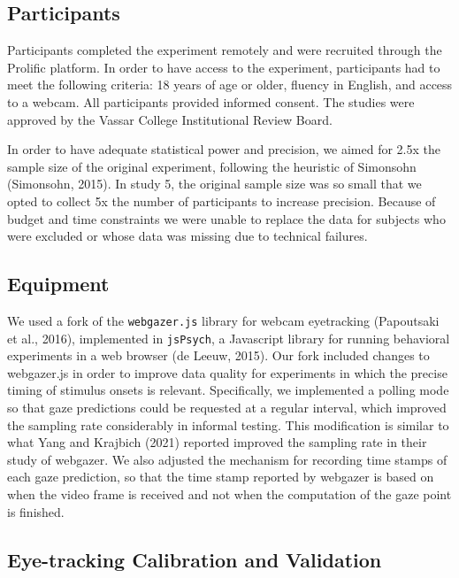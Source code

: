 \documentclass[
  man,floatsintext]{apa6}
\begin{document}
\hypertarget{participants}{%
\subsection{Participants}\label{participants}}

Participants completed the experiment remotely and were recruited
through the Prolific platform. In order to have access to the
experiment, participants had to meet the following criteria: 18 years of
age or older, fluency in English, and access to a webcam. All
participants provided informed consent. The studies were approved by the
Vassar College Institutional Review Board.

In order to have adequate statistical power and precision, we aimed for
2.5x the sample size of the original experiment, following the heuristic
of Simonsohn (Simonsohn, 2015). In study 5, the original sample size was so
small that we opted to collect 5x the number of participants to increase
precision. Because of budget and time constraints we were unable to
replace the data for subjects who were excluded or whose data was
missing due to technical failures.

\hypertarget{equipment}{%
\subsection{Equipment}\label{equipment}}

We used a fork of the \texttt{webgazer.js} library for webcam eyetracking
(Papoutsaki et al., 2016), implemented in \texttt{jsPsych}, a Javascript
library for running behavioral experiments in a web browser
(de Leeuw, 2015). Our fork included changes to
webgazer.js in order to improve data quality for experiments in which
the precise timing of stimulus onsets is relevant. Specifically, we
implemented a polling mode so that gaze predictions could be requested
at a regular interval, which improved the sampling rate considerably in
informal testing. This modification is similar to what Yang and Krajbich
(2021) reported improved the sampling rate in their study of
webgazer. We also adjusted the mechanism for recording time stamps of
each gaze prediction, so that the time stamp reported by webgazer is
based on when the video frame is received and not when the computation
of the gaze point is finished.

\hypertarget{eye-tracking-calibration-and-validation}{%
\subsection{Eye-tracking Calibration and Validation}\label{eye-tracking-calibration-and-validation}}
\end{document}

